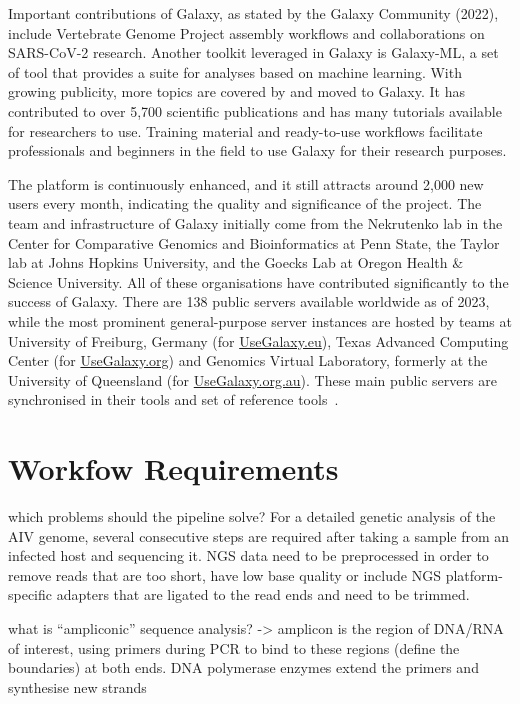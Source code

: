 Important contributions of Galaxy, as stated by the Galaxy Community (2022), include Vertebrate Genome Project assembly workflows and collaborations on \ac{SARS-CoV-2} research. Another toolkit leveraged in Galaxy is Galaxy-ML, a set of tool that provides a suite for analyses based on machine learning. With growing publicity, more topics are covered by and moved to Galaxy. It has contributed to over 5,700 scientific publications and has many tutorials available for researchers to use. Training material and ready-to-use workflows facilitate professionals and beginners in the field to use Galaxy for their research purposes.

The platform is continuously enhanced, and it still attracts around 2,000 new users every month, indicating the quality and significance of the project. The team and infrastructure of Galaxy initially come from the Nekrutenko lab in the Center for Comparative Genomics and Bioinformatics at Penn State, the Taylor lab at Johns Hopkins University, and the Goecks Lab at Oregon Health \& Science University. All of these organisations have contributed significantly to the success of Galaxy. There are 138 public servers available worldwide as of 2023, while the most prominent general-purpose server instances are hosted by teams at University of Freiburg, Germany (for \href{https://usegalaxy.eu/}{UseGalaxy.eu}), Texas Advanced Computing Center (for \href{https://usegalaxy.org/}{UseGalaxy.org}) and Genomics Virtual Laboratory, formerly at the University of Queensland (for \href{https://usegalaxy.org.au/}{UseGalaxy.org.au}). These main public servers are synchronised in their tools and set of reference tools~\cite{10.1093/nar/gkac247}.

\section{Workfow Requirements}
\todoit
which problems should the pipeline solve?
For a detailed genetic analysis of the \ac{AIV} genome, several consecutive steps are required after taking a sample from an infected host and sequencing it. \ac{NGS} data need to be preprocessed in order to remove reads that are too short, have low base quality or include \ac{NGS} platform-specific adapters that are ligated to the read ends and need to be trimmed.

what is ``ampliconic'' sequence analysis? -> amplicon is the region of \ac{DNA}/\ac{RNA} of interest, using primers during \ac{PCR} to bind to these regions (define the boundaries) at both ends. \ac{DNA} polymerase enzymes extend the primers and synthesise new strands

